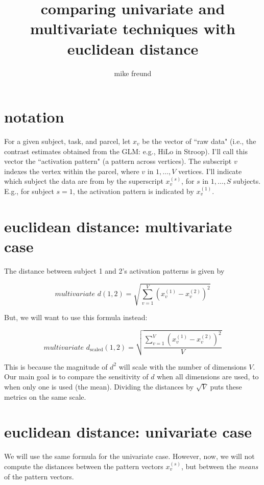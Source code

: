 \documentclass[]{article}
\title{comparing univariate and multivariate techniques with euclidean distance}
\author{mike freund}
\begin{document}
\maketitle


\section*{notation}

For a given subject, task, and parcel, let $x_v$ be the vector of ``raw data" (i.e., the contrast estimates obtained from the GLM: e.g., Hi\textunderscore Lo in Stroop).
I'll call this vector the ``activation pattern" (a pattern across vertices).
The subscript $v$ indexes the vertex within the parcel, where $v \text{ in } 1, \dots, V$ vertices.
I'll indicate which subject the data are from by the superscript $x_v^{(s)}$, for $s \text{ in } 1, \dots, S$ subjects.
E.g., for subject $s = 1$, the activation pattern is indicated by $x_v^{(1)}$.

\section*{euclidean distance: multivariate case}

The distance between subject 1 and 2's activation patterns is given by

\begin{equation}
	\textit{multivariate d}(1, 2) = \sqrt{\sum_{v = 1}^{V}(x_v^{(1)} - x_v^{(2)})^2}
\end{equation}


But, we will want to use this formula instead:

\begin{equation}
	\textit{multivariate d}_{\text{scaled}}(1, 2) = 
	\sqrt{
		\frac
		{\sum_{v = 1}^{V}(x_v^{(1)} - x_v^{(2)})^2}
		{V}
	}
\end{equation}

This is because the magnitude of $d^2$ will scale with the number of dimensions $V$.
Our main goal is to compare the sensitivity of $d$ when all dimensions are used, to when only one is used (the mean).
Dividing the distances by $\sqrt{V}$ puts these metrics on the same scale.

\section*{euclidean distance: univariate case}

We will use the same formula for the univariate case.
However, now, we will not compute the distances between the pattern vectors $x_v^{(s)}$, but between the \textit{means} of the pattern vectors.
\end{document}
